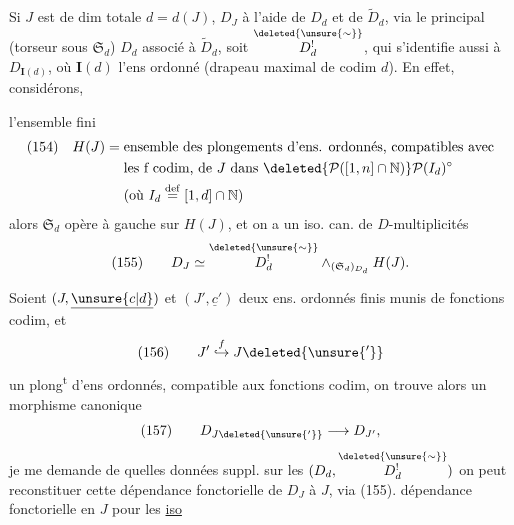 Si $J$ est de dim totale $d=d(J)$,    $D_J$ à l'aide de $D_d$ et de $\widetilde D_d$, via le  principal (torseur sous $\mathfrak S_d$)  $D_d$ associé à $\widetilde D_d$, soit $\overset{\deleted{\unsure{\sim}}}{D^!_d}$, qui s'identifie aussi à $D_{\mathbf I(d)}$, où $\mathbf I(d)$ l'ens ordonné
(drapeau maximal de codim $d$). En effet, considérons,

l'ensemble fini
\[
\begin{aligned}
(154)\quad H(J)={}&\text{ensemble des plongements d'ens. ordonnés, compatibles avec}\\
&\text{les f codim, de }J\text{ dans }\deleted{\mathcal P([1,n]\cap\mathbb N)}\mathcal P(I_d)^\circ\\
&\text{(où }I_d\overset{\mathrm{def}}=[1,d]\cap\mathbb N\text{)}
\end{aligned}
\]
alors $\mathfrak S_d$ opère à gauche sur $H(J)$, et on a un iso. can. de $D$-multiplicités
\[
(155)\qquad D_J\simeq\overset{\deleted{\unsure{\sim}}}{D^!_d}\mathbin{\wedge}_{(\mathfrak S_d)_{D_d}}H(J).
\]

Soient  $(J,\underline{\unsure{c|d}})$ et $(J',\underline{c}')$ deux ens. ordonnés finis munis de fonctions codim, et
\[
(156)\qquad J'\mathrel{\overset{f}{\hookrightarrow}}J\deleted{\unsure{'}}
\]
un plong\textsuperscript{t} d'ens ordonnés, compatible aux fonctions codim, on trouve alors un  morphisme canonique
\[
(157)\qquad D_{J\deleted{\unsure{'}}}\longrightarrow D_{J'},
\]
je me demande  de quelles données suppl.  sur les $(D_d,\overset{\deleted{\unsure{\sim}}}{D^!_d})$ on peut reconstituer cette dépendance fonctorielle de $D_J$  à $J$, via (155).   dépendance fonctorielle en $J$ pour les \uline{iso}

